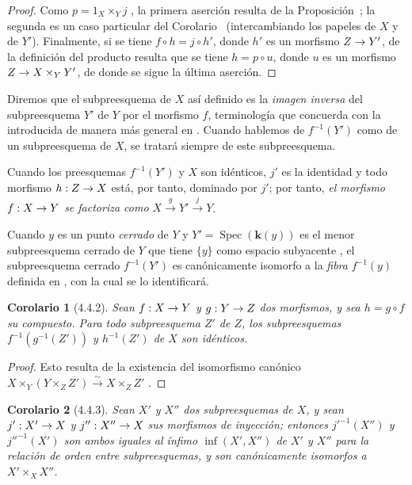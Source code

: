 \documentclass[oneside]{amsart}
\theoremstyle{ega-env-style}
\theoremstyle{ega-thm-env-style}
\newtheorem*{corollary}{Corolario}
\theoremstyle{ega-defn-env-style}
\renewcommand{\to}{\mathchoice{\longrightarrow}{\rightarrow}{\rightarrow}{\rightarrow}}
\newcommand{\oldpage}[2][]{{\marginnote{\normalfont{\textbf{#1}~|~#2}}}\ignorespaces}
\let\EGAOriginalLabel\label
\renewcommand{\label}[1]{\phantomsection\EGAOriginalLabel{#1}}
\begin{document}
\begin{proof}
Como $p=1_X\times_Y j$ , la primera aserción resulta de la Proposición~;
la segunda es un caso particular del Corolario~ (intercambiando los papeles de $X$ y de $Y'$).
Finalmente, si se tiene $f\circ h=j\circ h'$, donde $h'$ es un morfismo $Z\to Y'$, de la definición del producto resulta que se tiene $h=p\circ u$, donde $u$ es un morfismo $Z\to X\times_Y Y'$, de donde se sigue la última aserción.
\end{proof}

Diremos que el subpreesquema de $X$ así definido es la \emph{imagen inversa} del subpreesquema $Y'$ de $Y$ por el morfismo $f$, terminología que concuerda con la introducida
\oldpage[I]{126}
de manera más general en .
Cuando hablemos de $f^{-1}(Y')$ como de un subpreesquema de $X$, se tratará siempre de este subpreesquema.

Cuando los preesquemas $f^{-1}(Y')$ y $X$ son idénticos, $j'$ es la identidad y todo morfismo $h:Z\to X$ está, por tanto, dominado por $j'$; por tanto, \emph{el morfismo $f:X\to Y$ se factoriza como $X\xrightarrow{g}Y'\xrightarrow{j}Y$}.

Cuando $y$ es un punto \emph{cerrado} de $Y$ y $Y'=\operatorname{Spec}(\boldsymbol{k}(y))$ es el menor subpreesquema cerrado de $Y$ que tiene $\{y\}$ como espacio subyacente , el subpreesquema cerrado $f^{-1}(Y')$ es canónicamente isomorfo a la \emph{fibra} $f^{-1}(y)$ definida en , con la cual se lo identificará.

\begin{corollary}[4.4.2]
\label{I.4.4.2}
Sean $f:X\to Y$ y $g:Y\to Z$ dos morfismos, y sea $h=g\circ f$ su compuesto.
Para todo subpreesquema $Z'$ de $Z$, los subpreesquemas $f^{-1}(g^{-1}(Z'))$ y $h^{-1}(Z')$ de $X$ son idénticos.
\end{corollary}

\begin{proof}
Esto resulta de la existencia del isomorfismo canónico $X\times_Y(Y\times_Z Z')\xrightarrow{\sim}X\times_Z Z'$ .
\end{proof}

\begin{corollary}[4.4.3]
\label{I.4.4.3}
Sean $X'$ y $X''$ dos subpreesquemas de $X$, y sean $j':X'\to X$ y $j'':X''\to X$ sus morfismos de inyección;
entonces ${j'}^{-1}(X'')$ y ${j''}^{-1}(X')$ son ambos iguales al ínfimo $\inf(X',X'')$ de $X'$ y $X''$ para la relación de orden entre subpreesquemas, y son canónicamente isomorfos a $X'\times_X X''$.
\end{corollary}
\end{document}
